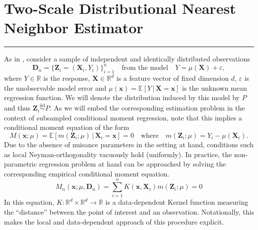 \documentclass[letterpaper,10pt]{article}
\numberwithin{equation}{section}
\numberwithin{thm}{section}
\numberwithin{lem}{section}
\numberwithin{cor}{section}
\newcommand{\1}{\mathbb{1}}
\begin{document}
\section{Two-Scale Distributional Nearest Neighbor Estimator}\label{TDNN}
\hrule
As in \citet{demirkaya_optimal_2024}, consider a sample of independent and identically distributed observations
\begin{equation}\label{DGP}
	\mathbf{D}_n = \{\mathbf{Z}_i = (\mathbf{X}_i, Y_i)\}_{i = 1}^{n}
	\quad \text{from the model} \quad
	Y = \mu(\mathbf{X}) + \varepsilon,
\end{equation}
where $Y \in \mathbb{R}$ is the response, $\mathbf{X} \in \mathbb{R}^d$ is a feature vector of fixed dimension $d$, $\varepsilon$ is the unobservable model error and $\mu(\mathbf{x}) = \mathbb{E}\left[Y \, | \, \mathbf{X} = \mathbf{x}\right]$ is the unknown mean regression function.
We will denote the distribution induced by this model by $P$ and thus $\mathbf{Z}_i \overset{\text{iid}}{\sim} P$.
As we will embed the corresponding estimation problem in the context of subsampled conditional moment regression, note that this implies a conditional moment equation of the form
\begin{equation}\label{CondMomEq}
	M(\mathbf{x}; \mu)
	= \mathbb{E}\left[m(\mathbf{Z}_i; \mu) \, | \, \mathbf{X}_i = \mathbf{x}\right]
	= 0
	\quad \text{where} \quad
	m(\mathbf{Z}_i; \mu) = Y_i - \mu(\mathbf{X}_i).
\end{equation}
Due to the absence of nuisance parameters in the setting at hand, conditions such as local Neyman-orthogonality vacuously hold (uniformly).
In practice, the non-parametric regression problem at hand can be approached by solving the corresponding empirical conditional moment equation.
\begin{equation}\label{EmpCondMomEq}
	M_n(\mathbf{x}; \mu, \mathbf{D}_n)
	= \sum_{i = 1}^{n}K(\mathbf{x}, \mathbf{X}_i)m(\mathbf{Z}_i; \mu)
	= 0
\end{equation}
In this equation, $K:\mathbb{R}^d \times \mathbb{R}^d \rightarrow \mathbb{R}$ is a data-dependent Kernel function measuring the ``distance'' between the point of interest and an observation.
Notationally, this makes the local and data-dependent approach of this procedure explicit.
\end{document}
